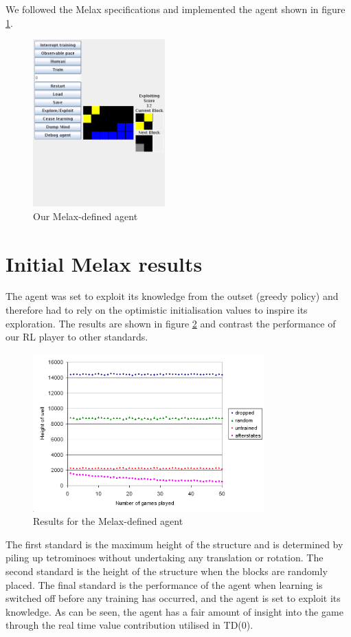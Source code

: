 \documentclass{rucsthesis}
\begin{document}
We followed the Melax specifications and implemented the agent shown in figure \ref{fig:mymelax}.

\begin{figure}[h]
\centering
\includegraphics[width=2in]{mymelax.png}
\caption{Our Melax-defined agent}
\label{fig:mymelax}
\end{figure}

\section{Initial Melax results}

The agent was set to exploit its knowledge from the outset (greedy policy) and therefore had to rely on the optimistic initialisation values to inspire its exploration. The results are shown in figure \ref{fig:mymelaxresults} and contrast the performance of our RL player to other standards. 

\begin{figure}[h]
\centering
\includegraphics[width=3.5in]{mymelaxresults.png}
\caption{Results for the Melax-defined agent}
\label{fig:mymelaxresults}
\end{figure}

The first standard is the maximum height of the structure and is determined by piling up tetrominoes without undertaking any translation or rotation. The second standard is the height of the structure when the blocks are randomly placed. The final standard is the performance of the agent when learning is switched off before any training has occurred, and the agent is set to exploit its knowledge. As can be seen, the agent has a fair amount of insight into the game through the real time value contribution utilised in TD(0).
\end{document}
